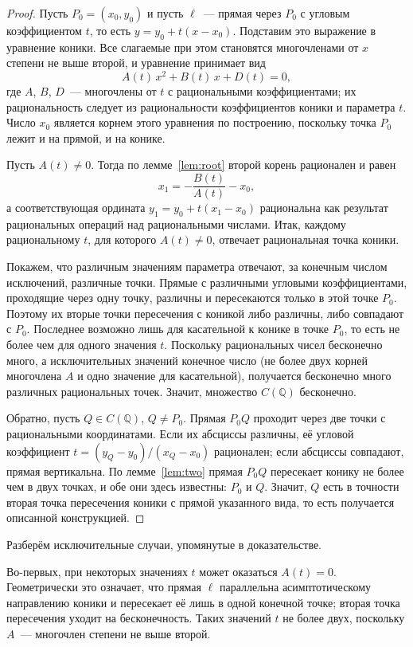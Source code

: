 \documentclass[a4paper,14pt]{extreport}
\theoremstyle{definition}
\newcommand{\Q}{\mathbb{Q}}
\begin{document}
\begin{proof}
Пусть $P_0=(x_0,y_0)$ и пусть $\ell$~--- прямая через $P_0$ с угловым
коэффициентом $t$, то есть $y=y_0+t(x-x_0)$. Подставим это выражение в
уравнение коники. Все слагаемые при этом становятся многочленами от $x$ степени
не выше второй, и уравнение принимает вид
\[
  A(t)\,x^2+B(t)\,x+D(t)=0,
\]
где $A$, $B$, $D$~--- многочлены от $t$ с рациональными коэффициентами; их
рациональность следует из рациональности коэффициентов коники и параметра $t$.
Число $x_0$ является корнем этого уравнения по построению, поскольку точка
$P_0$ лежит и на прямой, и на конике.

Пусть $A(t)\neq 0$. Тогда по лемме~\ref{lem:root} второй корень рационален и
равен
\[
  x_1=-\frac{B(t)}{A(t)}-x_0,
\]
а соответствующая ордината $y_1=y_0+t(x_1-x_0)$ рациональна как результат
рациональных операций над рациональными числами. Итак, каждому рациональному
$t$, для которого $A(t)\neq0$, отвечает рациональная точка коники.

Покажем, что различным значениям параметра отвечают, за конечным числом
исключений, различные точки. Прямые с различными угловыми коэффициентами,
проходящие через одну точку, различны и пересекаются только в этой точке $P_0$.
Поэтому их вторые точки пересечения с коникой либо различны, либо совпадают с
$P_0$. Последнее возможно лишь для касательной к конике в точке $P_0$, то есть
не более чем для одного значения $t$. Поскольку рациональных чисел бесконечно
много, а исключительных значений конечное число (не более двух корней
многочлена $A$ и одно значение для касательной), получается бесконечно много
различных рациональных точек. Значит, множество $C(\Q)$ бесконечно.

Обратно, пусть $Q\in C(\Q)$, $Q\neq P_0$. Прямая $P_0Q$ проходит через две точки
с рациональными координатами. Если их абсциссы различны, её угловой коэффициент
$t=(y_Q-y_0)/(x_Q-x_0)$ рационален; если абсциссы совпадают, прямая вертикальна.
По лемме~\ref{lem:two} прямая $P_0Q$ пересекает конику не более чем в двух
точках, и обе они здесь известны: $P_0$ и $Q$. Значит, $Q$ есть в точности
вторая точка пересечения коники с прямой указанного вида, то есть получается
описанной конструкцией.
\end{proof}

Разберём исключительные случаи, упомянутые в доказательстве.

Во-первых, при некоторых значениях $t$ может оказаться $A(t)=0$. Геометрически
это означает, что прямая $\ell$ параллельна асимптотическому направлению коники
и пересекает её лишь в одной конечной точке; вторая точка пересечения уходит на
бесконечность. Таких значений $t$ не более двух, поскольку $A$~--- многочлен
степени не выше второй.
\end{document}
